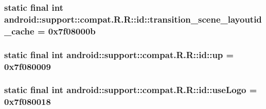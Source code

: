 \hypertarget{classandroid_1_1support_1_1compat_1_1_r_1_1id_1dcd317831c87b1304867a8a908efb67}{
\subsubsection[{transition\_\-scene\_\-layoutid\_\-cache}]{\setlength{\rightskip}{0pt plus 5cm}static final int android::support::compat.R.R::id::transition\_\-scene\_\-layoutid\_\-cache = 0x7f08000b}}
\label{classandroid_1_1support_1_1compat_1_1_r_1_1id_1dcd317831c87b1304867a8a908efb67}


\hypertarget{classandroid_1_1support_1_1compat_1_1_r_1_1id_2c75c34ada8eb48cfaa9bf2a291f160c}{
\subsubsection[{up}]{\setlength{\rightskip}{0pt plus 5cm}static final int android::support::compat.R.R::id::up = 0x7f080009}}
\label{classandroid_1_1support_1_1compat_1_1_r_1_1id_2c75c34ada8eb48cfaa9bf2a291f160c}


\hypertarget{classandroid_1_1support_1_1compat_1_1_r_1_1id_2b2533b0ac31800b9a0a2cef90301c10}{
\subsubsection[{useLogo}]{\setlength{\rightskip}{0pt plus 5cm}static final int android::support::compat.R.R::id::useLogo = 0x7f080018}}
\label{classandroid_1_1support_1_1compat_1_1_r_1_1id_2b2533b0ac31800b9a0a2cef90301c10}



